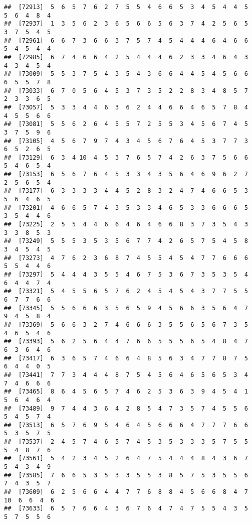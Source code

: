 \documentclass[
]{book}
\begin{document}
\begin{verbatim}
##  [72913]  5  6  5  7  6  2  7  5  5  4  6  6  5  3  4  5  4  4  5  5  6  4  8  4
##  [72937]  1  3  5  6  2  3  6  5  6  6  5  6  3  7  4  2  5  6  5  3  7  5  4  5
##  [72961]  6  6  7  3  6  6  3  7  5  7  4  5  4  4  4  6  4  6  6  5  4  5  4  4
##  [72985]  6  7  4  6  6  4  2  5  4  4  4  6  2  3  3  4  6  4  3  4  3  4  5  4
##  [73009]  5  5  3  7  5  4  3  5  4  3  6  6  4  4  5  4  5  6  6  6  5  5  7  8
##  [73033]  6  7  0  5  6  4  5  3  7  3  5  2  2  8  3  4  8  5  7  2  3  3  6  5
##  [73057]  5  3  3  4  4  6  3  6  2  4  4  6  6  4  6  5  7  8  4  4  5  5  6  6
##  [73081]  5  5  6  2  6  4  5  5  7  2  5  5  3  4  5  6  7  4  5  3  7  5  9  6
##  [73105]  4  5  6  7  9  7  4  3  4  5  6  7  6  4  5  3  7  7  3  6  5  2  6  5
##  [73129]  6  3  4 10  4  5  3  7  6  5  7  4  2  6  3  7  5  6  6  5  4  6  5  4
##  [73153]  6  5  6  7  6  4  5  3  3  4  3  5  6  4  6  9  6  2  7  2  5  6  5  4
##  [73177]  6  3  3  3  3  4  4  5  2  8  3  2  4  7  4  6  6  5  3  5  6  4  6  5
##  [73201]  4  6  6  5  7  4  3  5  3  3  4  6  5  3  3  6  6  6  5  3  5  4  4  6
##  [73225]  2  5  5  4  4  6  6  4  6  4  6  6  8  3  7  3  5  4  3  3  3  8  5  3
##  [73249]  5  5  5  3  5  3  5  6  7  7  4  2  6  5  7  5  4  5  8  3  4  5  4  5
##  [73273]  4  7  6  2  3  6  8  7  4  5  5  4  5  4  7  7  6  6  6  5  5  4  4  6
##  [73297]  5  4  4  4  3  5  5  4  6  7  5  3  6  7  3  5  3  5  4  6  4  4  7  4
##  [73321]  5  4  5  5  6  5  7  6  2  4  5  4  5  4  3  7  7  5  5  6  7  7  6  6
##  [73345]  5  5  6  6  6  3  5  6  5  9  4  5  6  6  3  5  6  4  7  9  4  5  8  4
##  [73369]  5  6  6  3  2  7  4  6  6  6  3  5  5  6  5  6  7  3  5  4  6  5  4  6
##  [73393]  5  6  2  5  6  4  4  7  6  6  5  5  5  6  5  4  8  4  7  6  3  6  4  6
##  [73417]  6  3  6  5  7  4  6  6  4  8  5  6  3  4  7  7  8  7  5  6  4  4  0  5
##  [73441]  7  7  3  4  4  4  8  7  5  4  5  6  4  6  5  6  5  3  4  7  4  6  6  6
##  [73465]  8  6  4  5  6  5  7  4  6  2  5  3  6  3  9  4  5  4  1  5  6  4  6  4
##  [73489]  9  7  4  4  3  6  4  2  8  5  4  7  3  5  7  4  5  5  6  5  4  5  7  4
##  [73513]  6  5  7  6  9  5  4  6  4  5  6  6  6  4  7  7  7  6  6  5  3  5  7  5
##  [73537]  2  4  5  7  4  6  5  7  4  5  3  5  3  3  3  5  7  5  5  5  4  8  7  6
##  [73561]  5  4  2  3  4  5  2  6  4  7  5  4  4  4  8  4  3  6  7  5  4  3  4  9
##  [73585]  7  6  6  5  3  5  3  3  5  5  3  8  5  7  5  3  5  5  6  7  4  3  5  7
##  [73609]  6  2  5  6  6  4  4  7  7  6  8  8  4  5  6  6  8  4  7 10  6  6  4  6
##  [73633]  6  5  7  6  6  4  3  6  7  6  4  7  4  7  5  5  4  3  5  5  7  5  5  6

\end{verbatim}
\end{document}
